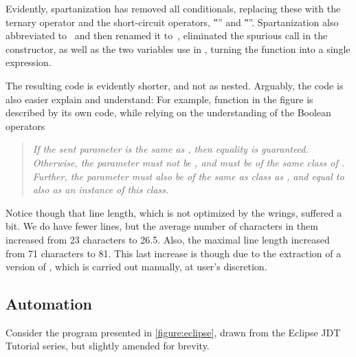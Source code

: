 Evidently, spartanization has removed all conditionals, replacing these with
the ternary operator and the short-circuit operators, ‟\cc{\textbar\textbar}”
and ‟”. Spartanization also abbreviated  to~ and then
renamed it to~, eliminated the spurious  call in the
constructor, as well as the two variables use in , turning the
function into a single expression.

The resulting code is evidently shorter, and not as nested. Arguably, the code
is also easier explain and understand: For example, function  in the figure is described by its own code, while relying on the
understanding of the Boolean operators

\vspace{-1ex}
\begin{quote}\itshape\scriptsize
  If the sent parameter is the same as , then equality is guaranteed.
  Otherwise, the parameter must not be , and must be of the same class
  of . Further, the parameter must also be of the same as class as
  , and equal to  also as an instance of this class.
\end{quote}
\vspace{-1ex}

Notice though that line length, which is not optimized by the wrings, suffered
a bit. We do have fewer lines, but the average number of characters in them
increased from 23 characters to 26.5. Also, the maximal line length increased
from 71 characters to 81. This last increase is though due to the
extraction of a  version of , which is carried
out manually, at user's discretion.

\subsection{Automation}
\label{section:automation}
Consider the \Java program presented in \cref{figure:eclipse}, drawn from the
Eclipse JDT Tutorial series,
but slightly amended for brevity.

